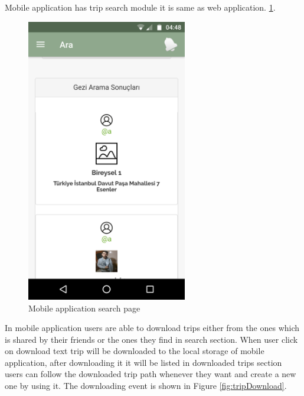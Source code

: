 \newpage

Mobile application has trip search module it is same as web application.
\ref{fig:mobilGeziArama}.

\begin{figure}[!htbp]
\centering
\includegraphics[width=70mm,scale=0.7]{projectChapters/images/mobilGeziArama.png}
\caption{Mobile application search page}
\label{fig:mobilGeziArama}
\end{figure}

\newpage

In mobile application users are able to download trips either from the ones which is shared by their friends or the ones they find in search section. When user click on download text trip will be downloaded to the local storage of mobile application, after downloading it it will be listed in downloaded trips section users can follow the downloaded trip path whenever they want and create a new one by using it. The downloading event is shown in Figure 
\ref{fig:tripDownload}.

